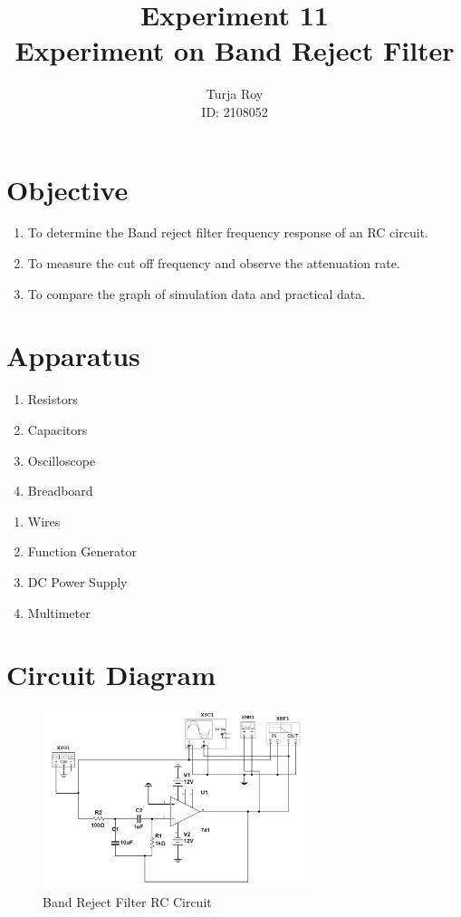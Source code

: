 \documentclass[12pt]{article}
\title{
    \textbf{Experiment 11} \\
    \textbf{Experiment on Band Reject Filter} \\
}
\author{
    Turja Roy \\
    ID: 2108052
}
\date{}
\begin{document}
\maketitle

\section{Objective}
\begin{enumerate}
    \item To determine the Band reject filter frequency response of an RC circuit. 
    \item To measure the cut off frequency and observe the attenuation rate. 
    \item To compare the graph of simulation data and practical data.
\end{enumerate}

\section{Apparatus}
\begin{multicols}{2}
    \begin{enumerate}
        \item Resistors
        \item Capacitors
        \item Oscilloscope
        \item Breadboard
    \end{enumerate}
    \columnbreak
    \begin{enumerate}
        \item Wires
        \item Function Generator
        \item DC Power Supply
        \item Multimeter
    \end{enumerate}
\end{multicols}

\section{Circuit Diagram}
\begin{figure}[h]
    \centering
    \includegraphics[width=0.7\textwidth]{BPF.png}
    \caption{Band Reject Filter RC Circuit}
\end{figure}
\end{document}
